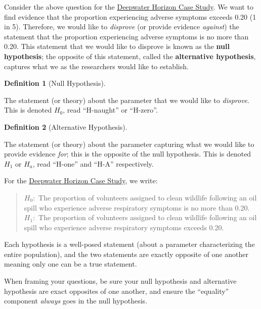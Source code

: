 \documentclass[
  letterpaper,
  DIV=11,
  numbers=noendperiod]{scrreprt}
\theoremstyle{plain}
\theoremstyle{definition}
\theoremstyle{definition}
\newtheorem{definition}{Definition}[chapter]
\theoremstyle{remark}
\begin{document}
Consider the above question for the
\href{01c-casedeepwater.qmd}{Deepwater Horizon Case Study}. We want to
find evidence that the proportion experiencing adverse symptoms exceeds
0.20 (1 in 5). Therefore, we would like to \emph{disprove} (or provide
evidence \emph{against}) the statement that the proportion experiencing
adverse symptoms is no more than 0.20. This statement that we would like
to disprove is known as the \textbf{null hypothesis}; the opposite of
this statement, called the \textbf{alternative hypothesis}, captures
what we as the researchers would like to establish.

\begin{definition}[Null
Hypothesis]\protect\hypertarget{def-null-hypothesis}{}\label{def-null-hypothesis}

The statement (or theory) about the parameter that we would like to
\emph{disprove}. This is denoted \(H_0\), read ``H-naught'' or
``H-zero''.

\end{definition}

\begin{definition}[Alternative
Hypothesis]\protect\hypertarget{def-alternative-hypothesis}{}\label{def-alternative-hypothesis}

The statement (or theory) about the parameter capturing what we would
like to provide evidence \emph{for}; this is the opposite of the null
hypothesis. This is denoted \(H_1\) or \(H_a\), read ``H-one'' and
``H-A'' respectively.

\end{definition}

For the \href{01c-casedeepwater.qmd}{Deepwater Horizon Case Study}, we
write:

\begin{quote}
\(H_0:\) The proportion of volunteers assigned to clean wildlife
following an oil spill who experience adverse respiratory symptoms is no
more than 0.20.\\
\(H_1:\) The proportion of volunteers assigned to clean wildlife
following an oil spill who experience adverse respiratory symptoms
exceeds 0.20.
\end{quote}

Each hypothesis is a well-posed statement (about a parameter
characterizing the entire population), and the two statements are
exactly opposite of one another meaning only one can be a true
statement.

\begin{tcolorbox}[enhanced jigsaw, breakable, titlerule=0mm, colframe=quarto-callout-note-color-frame, bottomtitle=1mm, opacityback=0, rightrule=.15mm, toptitle=1mm, arc=.35mm, bottomrule=.15mm, left=2mm, title=\textcolor{quarto-callout-note-color}{\faInfo}\hspace{0.5em}{Note}, leftrule=.75mm, coltitle=black, toprule=.15mm, colbacktitle=quarto-callout-note-color!10!white, colback=white, opacitybacktitle=0.6]

When framing your questions, be sure your null hypothesis and
alternative hypothesis are exact opposites of one another, and ensure
the ``equality'' component \emph{always} goes in the null hypothesis.

\end{tcolorbox}
\end{document}
